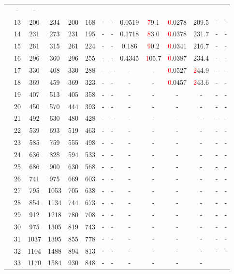 \begin{table}[htb]
{\begin{tabular}{|c|c|c|c|c|c|c|c|c|c|c|c|c|c|}
 & - & -
 \\
 & 
13 & 200 & 234 & 200 & 168
 & - & -
 & 0.0519 & \textcolor{red}79.1
 & \textcolor{red}0.0278 & 209.5
 & - & -
 \\
 & 
14 & 231 & 273 & 231 & 195
 & - & -
 & 0.1718 & \textcolor{red}83.0
 & \textcolor{red}0.0378 & 231.7
 & - & -
 \\
 & 
15 & 261 & 315 & 261 & 224
 & - & -
 & 0.186 & \textcolor{red}90.2
 & \textcolor{red}0.0341 & 216.7
 & - & -
 \\
 & 
16 & 296 & 360 & 296 & 255
 & - & -
 & 0.4345 & \textcolor{red}105.7
 & \textcolor{red}0.0387 & 234.4
 & - & -
 \\
 & 
17 & 330 & 408 & 330 & 288
 & - & -
 & - & -
 & \textcolor{red}0.0527 & \textcolor{red}244.9
 & - & -
 \\
 & 
18 & 369 & 459 & 369 & 323
 & - & -
 & - & -
 & \textcolor{red}0.0457 & \textcolor{red}243.6
 & - & -
 \\
 & 
19 & 407 & 513 & 405 & 358
 & - & -
 & - & -
 & - & -
 & - & -
 \\
 & 
20 & 450 & 570 & 444 & 393
 & - & -
 & - & -
 & - & -
 & - & -
 \\
 & 
21 & 492 & 630 & 480 & 428
 & - & -
 & - & -
 & - & -
 & - & -
 \\
 & 
22 & 539 & 693 & 519 & 463
 & - & -
 & - & -
 & - & -
 & - & -
 \\
 & 
23 & 585 & 759 & 555 & 498
 & - & -
 & - & -
 & - & -
 & - & -
 \\
 & 
24 & 636 & 828 & 594 & 533
 & - & -
 & - & -
 & - & -
 & - & -
 \\
 & 
25 & 686 & 900 & 630 & 568
 & - & -
 & - & -
 & - & -
 & - & -
 \\
 & 
26 & 741 & 975 & 669 & 603
 & - & -
 & - & -
 & - & -
 & - & -
 \\
 & 
27 & 795 & 1053 & 705 & 638
 & - & -
 & - & -
 & - & -
 & - & -
 \\
 & 
28 & 854 & 1134 & 744 & 673
 & - & -
 & - & -
 & - & -
 & - & -
 \\
 & 
29 & 912 & 1218 & 780 & 708
 & - & -
 & - & -
 & - & -
 & - & -
 \\
 & 
30 & 975 & 1305 & 819 & 743
 & - & -
 & - & -
 & - & -
 & - & -
 \\
 & 
31 & 1037 & 1395 & 855 & 778
 & - & -
 & - & -
 & - & -
 & - & -
 \\
 & 
32 & 1104 & 1488 & 894 & 813
 & - & -
 & - & -
 & - & -
 & - & -
 \\
 & 
33 & 1170 & 1584 & 930 & 848
 & - & -
 & - & -
 & - & -

\end{tabular}}
\end{table}
